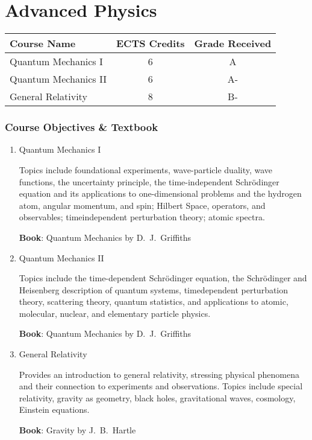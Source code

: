 \documentclass[11pt]{article}
\begin{document}
\section*{Advanced Physics}

\begin{center}
\begin{tabular}{lcc}
Course Name & ECTS Credits & Grade Received \\ \toprule
Quantum Mechanics I & 6 & A \\
Quantum Mechanics II & 6 & A- \\
General Relativity & 8 & B-
\end{tabular}
\end{center}

\subsubsection*{Course Objectives \& Textbook}
\begin{enumerate}
    \item Quantum Mechanics I
    
    Topics include foundational experiments, wave-particle duality, wave functions, the uncertainty principle, the time-independent Schrödinger equation and its applications to one-dimensional problems and the hydrogen atom, angular momentum, and spin; Hilbert Space, operators, and observables; timeindependent perturbation theory; atomic spectra.
    
    \textbf{Book}: Quantum Mechanics by D.\ J.\ Griffiths

    \item Quantum Mechanics II
    
    Topics include the time-dependent Schrödinger equation, the Schrödinger and Heisenberg description of quantum systems, timedependent perturbation theory, scattering theory, quantum statistics, and applications to atomic, molecular, nuclear, and elementary particle physics.
    
    \textbf{Book}: Quantum Mechanics by D.\ J.\ Griffiths
    
    \item General Relativity
    
    Provides an introduction to general relativity, stressing physical phenomena and their connection to experiments and observations. Topics include special relativity, gravity as geometry, black holes, gravitational waves, cosmology, Einstein equations.
    
    \textbf{Book}: Gravity by J.\ B.\ Hartle
\end{enumerate}
\end{document}
